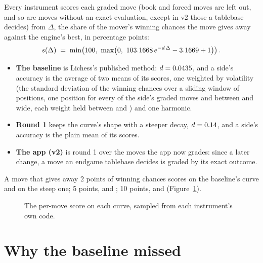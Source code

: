\documentclass[11pt]{article}
\begin{document}
Every instrument scores each graded move (book and forced moves are left out, and so are moves
without an exact evaluation, except in v2 those a tablebase decides) from $\Delta$, the share of the mover's winning chances the move
gives away against the engine's best, in percentage points:
\[
  s(\Delta) \;=\; \min\!\left(100,\ \max\!\left(0,\ \CurveA\, e^{-d\,\Delta} - \CurveC + 1\right)\right).
\]
\begin{itemize}[nosep]
\item \textbf{The baseline} is Lichess's published method: $d = 0.0435$, and a side's
accuracy is the average of two means of its scores, one weighted by volatility (the standard
deviation of the winning chances over a sliding window of positions, one position for every
\WindowShare{} of the side's graded moves and between \WindowMin{} and \WindowMax{} wide, each
weight held between \WeightMin{} and \WeightMax) and one harmonic.
\item \textbf{Round 1} keeps the curve's shape with a steeper decay, $d = 0.14$, and a
side's accuracy is the plain mean of its scores.
\item \textbf{The app (v2)} is round 1 over the moves the app now grades: since a later change,
a move an endgame tablebase decides is graded by its exact outcome.
\end{itemize}
A move that gives away 2 points of winning chances scores \BaseAtTwo{} on the baseline's curve
and \AppAtTwo{} on the steep one; 5 points, \BaseAtFive{} and \AppAtFive; 10 points,
\BaseAtTen{} and \AppAtTen{} (Figure~\ref{fig:curves}).

\begin{figure}[!htbp]
\centering
{}
\caption{The per-move score on each curve, sampled from each instrument's own code.}
\label{fig:curves}
\end{figure}

\section{Why the baseline missed}
\end{document}

